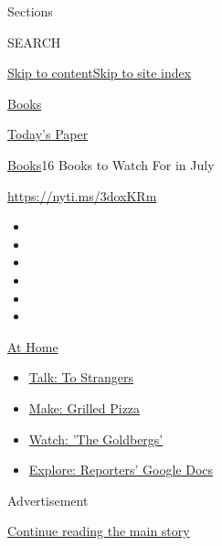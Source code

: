 Sections

SEARCH

\protect\hyperlink{site-content}{Skip to
content}\protect\hyperlink{site-index}{Skip to site index}

\href{https://www.nytimes.com/section/books}{Books}

\href{https://myaccount.nytimes.com/auth/login?response_type=cookie\&client_id=vi}{}

\href{https://www.nytimes.com/section/todayspaper}{Today's Paper}

\href{/section/books}{Books}\textbar{}16 Books to Watch For in July

\url{https://nyti.ms/3doxKRm}

\begin{itemize}
\item
\item
\item
\item
\item
\item
\end{itemize}

\href{https://www.nytimes.com/spotlight/at-home?action=click\&pgtype=Article\&state=default\&region=TOP_BANNER\&context=at_home_menu}{At
Home}

\begin{itemize}
\tightlist
\item
  \href{https://www.nytimes.com/2020/08/03/well/family/the-benefits-of-talking-to-strangers.html?action=click\&pgtype=Article\&state=default\&region=TOP_BANNER\&context=at_home_menu}{Talk:
  To Strangers}
\item
  \href{https://www.nytimes.com/2020/08/01/at-home/coronavirus-make-pizza-on-a-grill.html?action=click\&pgtype=Article\&state=default\&region=TOP_BANNER\&context=at_home_menu}{Make:
  Grilled Pizza}
\item
  \href{https://www.nytimes.com/2020/07/31/arts/television/goldbergs-abc-stream.html?action=click\&pgtype=Article\&state=default\&region=TOP_BANNER\&context=at_home_menu}{Watch:
  'The Goldbergs'}
\item
  \href{https://www.nytimes.com/interactive/2020/at-home/even-more-reporters-editors-diaries-lists-recommendations.html?action=click\&pgtype=Article\&state=default\&region=TOP_BANNER\&context=at_home_menu}{Explore:
  Reporters' Google Docs}
\end{itemize}

Advertisement

\protect\hyperlink{after-top}{Continue reading the main story}

